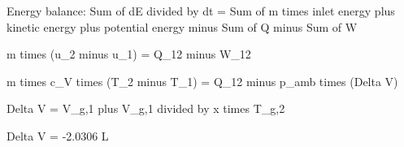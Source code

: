 Energy balance:  
Sum of dE divided by dt = Sum of m times inlet energy plus kinetic energy plus potential energy minus Sum of Q minus Sum of W  

m times (u_2 minus u_1) = Q_12 minus W_12  

m times c_V times (T_2 minus T_1) = Q_12 minus p_amb times (Delta V)  

Delta V = V_g,1 plus V_g,1 divided by x times T_g,2  

Delta V = -2.0306 L
